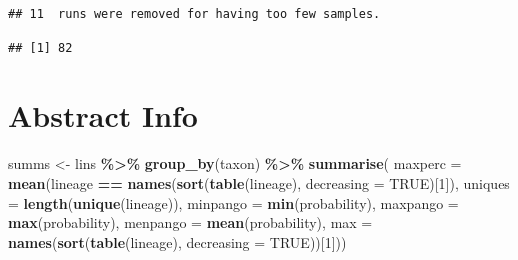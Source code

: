 \documentclass[
]{article}
\newenvironment{Shaded}{\begin{snugshade}}{\end{snugshade}}
\newcommand{\CommentTok}[1]{\textcolor[rgb]{0.56,0.35,0.01}{\textit{#1}}}
\newcommand{\DataTypeTok}[1]{\textcolor[rgb]{0.13,0.29,0.53}{#1}}
\newcommand{\DecValTok}[1]{\textcolor[rgb]{0.00,0.00,0.81}{#1}}
\newcommand{\KeywordTok}[1]{\textcolor[rgb]{0.13,0.29,0.53}{\textbf{#1}}}
\newcommand{\NormalTok}[1]{#1}
\newcommand{\OperatorTok}[1]{\textcolor[rgb]{0.81,0.36,0.00}{\textbf{#1}}}
\newcommand{\OtherTok}[1]{\textcolor[rgb]{0.56,0.35,0.01}{#1}}
\newcommand{\StringTok}[1]{\textcolor[rgb]{0.31,0.60,0.02}{#1}}
\begin{document}
\begin{verbatim}
## 11  runs were removed for having too few samples.
\end{verbatim}

\begin{Shaded}
\end{Shaded}

\begin{verbatim}
## [1] 82
\end{verbatim}

\hypertarget{abstract-info}{%
\section{Abstract Info}\label{abstract-info}}

\begin{Shaded}
\begin{Highlighting}[]
\NormalTok{summs \textless{}{-}}\StringTok{ }\NormalTok{lins }\OperatorTok{\%\textgreater{}\%}
\StringTok{    }\KeywordTok{group\_by}\NormalTok{(taxon) }\OperatorTok{\%\textgreater{}\%}
\StringTok{    }\KeywordTok{summarise}\NormalTok{(}
        \DataTypeTok{maxperc =} \KeywordTok{mean}\NormalTok{(lineage }\OperatorTok{==}\StringTok{ }\KeywordTok{names}\NormalTok{(}\KeywordTok{sort}\NormalTok{(}\KeywordTok{table}\NormalTok{(lineage),}
            \DataTypeTok{decreasing =} \OtherTok{TRUE}\NormalTok{)[}\DecValTok{1}\NormalTok{]),}
        \DataTypeTok{uniques =} \KeywordTok{length}\NormalTok{(}\KeywordTok{unique}\NormalTok{(lineage)),}
        \DataTypeTok{minpango =} \KeywordTok{min}\NormalTok{(probability),}
        \DataTypeTok{maxpango =} \KeywordTok{max}\NormalTok{(probability),}
        \DataTypeTok{menpango =} \KeywordTok{mean}\NormalTok{(probability),}
        \DataTypeTok{max =} \KeywordTok{names}\NormalTok{(}\KeywordTok{sort}\NormalTok{(}\KeywordTok{table}\NormalTok{(lineage), }\DataTypeTok{decreasing =} \OtherTok{TRUE}\NormalTok{))[}\DecValTok{1}\NormalTok{]))}
\end{Highlighting}
\end{Shaded}
\end{document}
